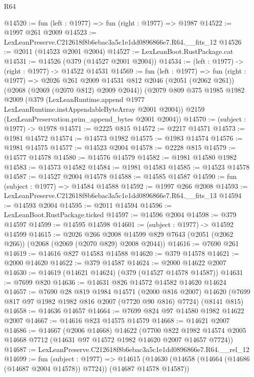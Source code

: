 \begin{lexlean}{R64}
\begin{coremodule}
@14520 := fun (left : @1977) => fun (right : @1977) => @1987
@14522 := @1997 @261 @2009
@14523 := LexLeanPreserve.C212618f8b6ebac3a5c1e1dd0896866e7.R64.__fits_12
@14526 := @2011 (@14523 @2001 @2004)
@14527 := LexLeanBoot.RustPackage.cat
@14531 := @14526 (@379 (@14527 @2001 @2004))
@14534 := (left : @1977) -> (right : @1977) -> @14522 @14531
@14569 := fun (left : @1977) =>
  fun (right : @1977) =>
  @2026
    @261
    @2009
    @14531
    @812
    @2046
    (@2051 (@2062 @261))
    (@2068 (@2069 (@2070 @812) @2009 @2044))
    (@2079
      @809
      @375
      @1985
      @1982
      @2009
      (@379 (LexLeanRuntime.append @1977 LexLeanRuntime.instAppendableByteArray @2001 @2004))
      @2159
      (LexLeanPreservation.prim_append_bytes @2001 @2004))
@14570 := (subject : @1977) -> @1978
@14571 := @2225 @815
@14572 := @2217 @14571
@14573 := @1981 @14572
@14574 := @14573 @1982
@14575 := @1983 @14574
@14576 := @1981 @14575
@14577 := @14523 @2004
@14578 := @2228 @815
@14579 := @14577 @14578
@14580 := @14576 @14579
@14582 := @1981 @14580 @1982
@14583 := @14573 @14582
@14584 := @1981 @14583
@14585 := @14523 @14578
@14587 := @14527 @2004 @14578
@14588 := @14585 @14587
@14590 := fun (subject : @1977) => @14584 @14588
@14592 := @1997 @266 @2008
@14593 := LexLeanPreserve.C212618f8b6ebac3a5c1e1dd0896866e7.R64.__fits_13
@14594 := @14593 @2004
@14595 := @2011 @14594
@14596 := LexLeanBoot.RustPackage.ticked
@14597 := @14596 @2004
@14598 := @379 @14597
@14599 := @14595 @14598
@14601 := (subject : @1977) -> @14592 @14599
@14615 := @2026
    @266
    @2008
    @14599
    @829
    @7643
    (@2051 (@2062 @266))
    (@2068 (@2069 (@2070 @829) @2008 @2044))
@14616 := @7690 @261
@14619 := @14616 @827 @14583 @14588
@14620 := @379 @14578
@14621 := @2000 @14620
@14622 := @379 @14587
@14624 := @2000 @14622 @2007
@14630 := @14619 (@14621 @14624) (@379 (@14527 @14578 @14587))
@14631 := @7699 @820
@14636 := @14631 @826 @14572 @14582 @14620 @14624
@14657 := @7690
    @28
    @819
    @1984
    @14571
    (@2000 @816 @2007)
    @14620
    (@7699 @817 @97 @1982 @1982 @816 @2007 (@7720 @90 @816) @7724)
    (@8141 @815)
@14658 := @14636 @14657
@14664 := @7699 @824 @97 @14580 @1982 @14622 @2007
@14667 := @14616 @823 @14575 @14579
@14668 := @14621 @2007
@14686 := @14667
    (@2006 @14668)
    @14622
    (@7700 @822 @1982 @14574 @2005 @14668 @7712 (@14631 @97 @14572 @1982 @14620 @2007 @14657 @7724))
@14687 := LexLeanPreserve.C212618f8b6ebac3a5c1e1dd0896866e7.R64.__rel_12
@14699 := fun (subject : @1977) =>
  @14615 (@14630 (@14658 (@14664 (@14686 (@14687 @2004 @14578)) @7724)) (@14687 @14578 @14587))

\end{coremodule}
\end{lexlean}

